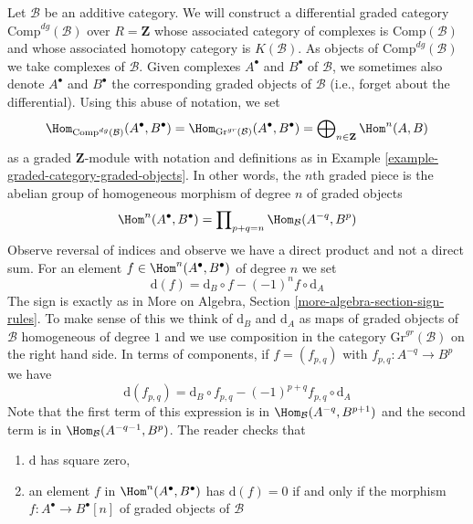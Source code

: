 \begin{example}
\label{example-category-complexes}
Let $\mathcal{B}$ be an additive category. We will construct
a differential graded category $\text{Comp}^{dg}(\mathcal{B})$
over $R = \mathbf{Z}$ whose associated category of complexes
is $\text{Comp}(\mathcal{B})$ and whose associated homotopy
category is $K(\mathcal{B})$. As objects of $\text{Comp}^{dg}(\mathcal{B})$
we take complexes of $\mathcal{B}$. Given complexes
$A^\bullet$ and $B^\bullet$ of $\mathcal{B}$, we sometimes also
denote $A^\bullet$ and $B^\bullet$ the corresponding graded objects
of $\mathcal{B}$ (i.e., forget about the differential).
Using this abuse of notation, we set
$$
\Hom_{\text{Comp}^{dg}(\mathcal{B})}(A^\bullet, B^\bullet) =
\Hom_{\text{Gr}^{gr}(\mathcal{B})}(A^\bullet, B^\bullet) =
\bigoplus\nolimits_{n \in \mathbf{Z}} \Hom^n(A, B)
$$
as a graded $\mathbf{Z}$-module with notation and definitions as
in Example \ref{example-graded-category-graded-objects}.
In other words, the $n$th graded piece is
the abelian group of homogeneous morphism of degree $n$ of graded objects
$$
\Hom^n(A^\bullet, B^\bullet) =
\prod\nolimits_{p + q = n} \Hom_\mathcal{B}(A^{-q}, B^p)
$$
Observe reversal of indices and observe we have a direct product
and not a direct sum. For an element
$f \in \Hom^n(A^\bullet, B^\bullet)$ of degree $n$ we set
$$
\text{d}(f) = \text{d}_B \circ f - (-1)^n f \circ \text{d}_A
$$
The sign is exactly as in
More on Algebra, Section \ref{more-algebra-section-sign-rules}.
To make sense of this we think of $\text{d}_B$ and $\text{d}_A$
as maps of graded objects of $\mathcal{B}$ homogeneous of degree $1$
and we use composition in the category $\text{Gr}^{gr}(\mathcal{B})$
on the right hand side. In terms of components, if $f = (f_{p, q})$ with
$f_{p, q} : A^{-q} \to B^p$ we have
\begin{equation}
\label{equation-differential-hom-complex}
\text{d}(f_{p, q}) =
\text{d}_B \circ f_{p, q} - (-1)^{p + q} f_{p, q} \circ \text{d}_A 
\end{equation}
Note that the first term of this expression is in
$\Hom_\mathcal{B}(A^{-q}, B^{p + 1})$ and the second term is in
$\Hom_\mathcal{B}(A^{-q - 1}, B^p)$. The reader checks that
\begin{enumerate}
\item $\text{d}$ has square zero,
\item an element $f$ in $\Hom^n(A^\bullet, B^\bullet)$
has $\text{d}(f) = 0$ if and only if the morphism
$f : A^\bullet \to B^\bullet[n]$ of graded objects of $\mathcal{B}$

\end{enumerate}
\end{example}
